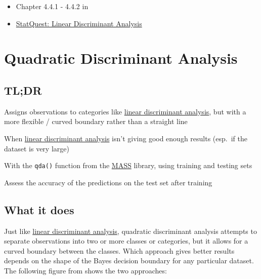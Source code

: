 \documentclass[
]{book}
\providecommand{\tightlist}{%
  \setlength{\itemsep}{0pt}\setlength{\parskip}{0pt}}
\begin{document}
\begin{itemize}
\tightlist
\item
  Chapter 4.4.1 - 4.4.2 in \citet{ISLR}
\item
  \href{https://www.youtube.com/watch?v=azXCzI57Yfc}{StatQuest: Linear Discriminant Analysis}
\end{itemize}

\hypertarget{quadratic-discriminant-analysis}{%
\chapter{Quadratic Discriminant Analysis}\label{quadratic-discriminant-analysis}}

\hypertarget{tldr-4}{%
\section{TL;DR}\label{tldr-4}}

\begin{description}
\tightlist
\item[What it does]
Assigns observations to categories like \protect\hyperlink{linear-discriminant-analysis}{linear discriminant analysis}, but with a more flexible / curved boundary rather than a straight line
\item[When to do it]
When \protect\hyperlink{linear-discriminant-analysis}{linear discriminant analysis} isn't giving good enough results (esp.~if the dataset is very large)
\item[How to do it]
With the \texttt{qda()} function from the \href{https://cran.r-project.org/package=MASS}{MASS} library, using training and testing sets
\item[How to assess it]
Assess the accuracy of the predictions on the test set after training
\end{description}

\hypertarget{what-it-does-4}{%
\section{What it does}\label{what-it-does-4}}

Just like \protect\hyperlink{linear-discriminant-analysis}{linear discriminant analysis}, quadratic discriminant analysis attempts to separate observations into two or more classes or categories, but it allows for a curved boundary between the classes. Which approach gives better results depends on the shape of the Bayes decision boundary for any particular dataset. The following figure from \citet{ISLR} shows the two approaches:
\end{document}

